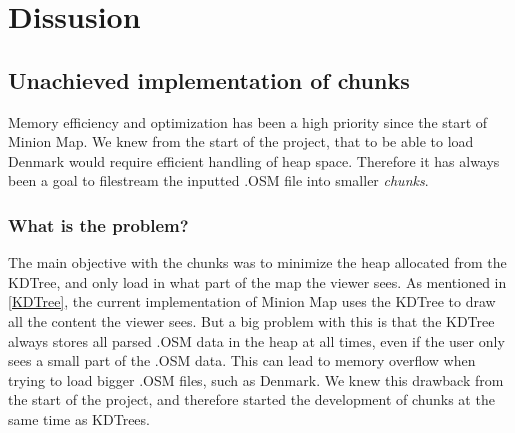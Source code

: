 \section{Dissusion}
\subsection{Unachieved implementation of chunks} \label{DiscussionChunks}
Memory efficiency and optimization has been a high priority since the start of Minion Map. We knew from the start of the project, that to be able to load Denmark would require efficient handling of heap space. Therefore it has always been a goal to filestream the inputted .OSM file into smaller \textit{chunks}. 
\subsubsection{What is the problem?}
The main objective with the chunks was to minimize the heap allocated from the KDTree, and only load in what part of the map the viewer sees. As mentioned in \ref{KDTree}, the current implementation of Minion Map uses the KDTree to draw all the content the viewer sees. But a big problem with this is that the KDTree always stores all parsed .OSM data in the heap at all times, even if the user only sees a small part of the .OSM data. This can lead to memory overflow when trying to load bigger .OSM files, such as Denmark. We knew this drawback from the start of the project, and therefore started the development of chunks at the same time as KDTrees. 
